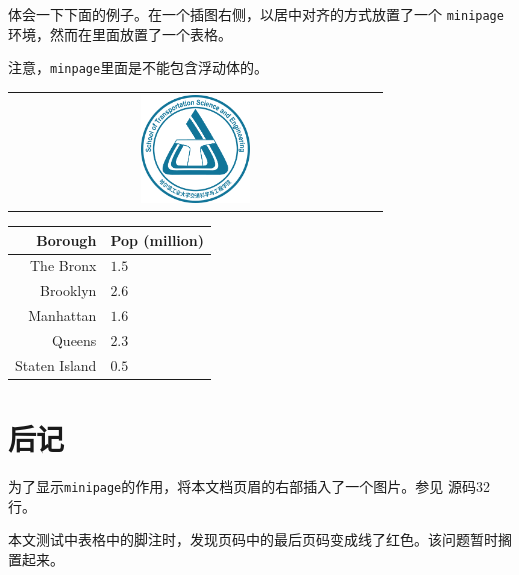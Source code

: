 \documentclass{article}
\begin{document}
体会一下下面的例子。在一个插图右侧，以居中对齐的方式放置了一个
\texttt{minipage}环境，然而在里面放置了一个表格。

注意，\texttt{minpage}里面是不能包含浮动体的。

\newcommand*{\vcenteredhbox}[1]{\begin{tabular}{@{}c@{}}#1\end{tabular}}
\begin{center}
  \vcenteredhbox{\includegraphics[width=0.3\textwidth]{logo.png}}
  \hspace{0.1\textwidth}
  \begin{minipage}{0.5\textwidth}
    \begin{tabular}{r|l}
      \multicolumn{1}{r}{Borough} &Pop (million)  \\ \hline
      The Bronx      &$1.5$  \\
      Brooklyn       &$2.6$  \\
      Manhattan      &$1.6$  \\
      Queens         &$2.3$  \\
      Staten Island  &$0.5$  
    \end{tabular}
  \end{minipage}              
\end{center}

\section{后记}

为了显示\texttt{minipage}的作用，将本文档页眉的右部插入了一个图片。参见
源码32行。

本文测试中表格中的脚注时，发现页码中的最后页码变成线了红色。该问题暂时搁
置起来。
\end{document}

